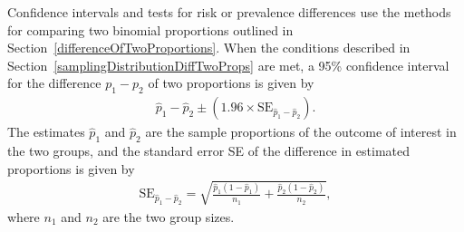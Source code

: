 Confidence intervals and tests for risk or prevalence differences use the methods for comparing two binomial proportions outlined in Section~\ref{differenceOfTwoProportions}. When the conditions described in Section~\ref{samplingDistributionDiffTwoProps} are met, a 95\% confidence interval for the difference $p_1 - p_2$ of two proportions is given by
\begin{align*}
  \hat{p}_1 - \hat{p}_2 \pm ( 1.96 \times \text{SE}_{\hat{p}_1 - \hat{p}_2}).
\end{align*}
The estimates $\hat{p}_1$ and $\hat{p}_2$ are the sample proportions of the outcome of interest in the two groups, and the standard error SE of the difference in estimated proportions is given by
\begin{align*}
  \text{SE}_{\hat{p}_1 - \hat{p}_2}
= \sqrt{\frac{\hat{p}_1(1-\hat{p}_1)}{n_1} + \frac{\hat{p}_2(1-\hat{p}_2)}{n_2}},
\end{align*}
where $n_1$ and $n_2$ are the two group sizes.


